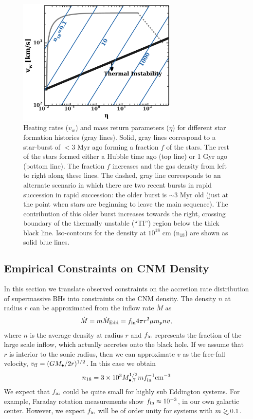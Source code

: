 \documentclass[usenatbib,fleqn]{mnras}
\newcommand\gsim{\mathrel{\rlap{\lower4pt\hbox{\hskip1pt$\sim$}}
    \raise1pt\hbox{$>$}}}
\begin{document}
\begin{figure} 
  \includegraphics[width=8cm]{cnm_plot.pdf}
  \caption{\label{fig:param} Heating rates ($v_w$) and mass return
    parameters ($\eta$) for different star formation histories (gray
    lines). Solid, gray lines correspond to a star-burst of $<3$ Myr
    ago forming a fraction $f$ of the stars. The rest of the stars
    formed either a Hubble time ago (top line) or 1 Gyr ago (bottom
    line). The fraction $f$ increases and the gas density from left to
    right along these lines. The dashed, gray line corresponds to an
    alternate scenario in which there are two recent bursts in rapid
    succession in rapid succession: the older burst is $\sim 3$ Myr
    old (just at the point when stars are beginning to leave the main
    sequence). The contribution of this older burst increases towards
    the right, crossing boundary of the thermally unstable (``TI'')
    region below the thick black line. Iso-contours for the density at
    $10^{18}$ cm ($\mathrm{n_{18}}$) are shown as solid blue lines.} 
\end{figure}


\subsection{Empirical Constraints on CNM Density}

In this section we translate observed constraints on the accretion rate distribution of supermassive BHs into constraints on the CNM density.  The density $n$ at radius $r$ can be approximated from the inflow rate $\dot{M}$ as
\begin{equation}
\dot{M} = m \dot{M}_{\rm Edd}= f_{\rm in} 4 \pi r^2 \mu m_p n v,
\label{eq:mdot}
\end{equation}
where $n$ is the average density at radius $r$ and $f_{\rm in}$
represents the fraction of the large scale inflow, which actually
accretes onto the black hole.  If we assume that $r$ is interior to
the sonic radius, then we can approximate $v$ as the free-fall
velocity, $v_{\rm ff} = (GM_{\bullet}/2r)^{1/2}$.  In this case we
obtain
\begin{equation}
n_{18} = 3 \times 10^3 M_{\bullet,7}^{1/2} m f_{\rm in}^{-1} {\rm
  cm}^{-3}
\label{eq:n18Edd}
\end{equation}
We expect that $f_{\rm in}$ could be quite small for highly sub
Eddington systems. For example, Faraday rotation measurements
\citep{Quataert+2000} show $f_{\rm in}\approx 10^{-3}$, in our own
galactic center. However, we expect $f_{\rm in}$ will be of order
unity for systems with $m\gsim 0.1$.  
\end{document}
